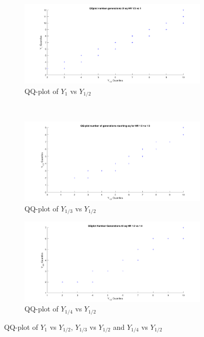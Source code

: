 \begin{figure}[H]
	
    \centering
    \begin{subfigure}{0.6\textwidth}
        \includegraphics[width=\textwidth]{QQplotATGEN3}
        \caption{QQ-plot of $Y_{1}$ vs $Y_{1/2}$}
        \label{fig:QQplotATGEN3}
    \end{subfigure}
    ~ %
    \begin{subfigure}{0.6\textwidth}
        \includegraphics[width=\textwidth]{QQplotATGEN1}
        \caption{QQ-plot of $Y_{1/3}$ vs $Y_{1/2}$}
        \label{fig:QQplotATGEN1}
    \end{subfigure}
    \begin{subfigure}{0.6\textwidth}
        \includegraphics[width=\textwidth]{QQplotATGEN2}
        \caption{QQ-plot of $Y_{1/4}$ vs $Y_{1/2}$}
        \label{fig:QQplotATGEN2}
    \end{subfigure}
    \caption{QQ-plot of $Y_{1}$ vs $Y_{1/2}$, $Y_{1/3}$ vs $Y_{1/2}$ and $Y_{1/4}$ vs $Y_{1/2}$}\label{fig:QQ-plot}
\end{figure}
